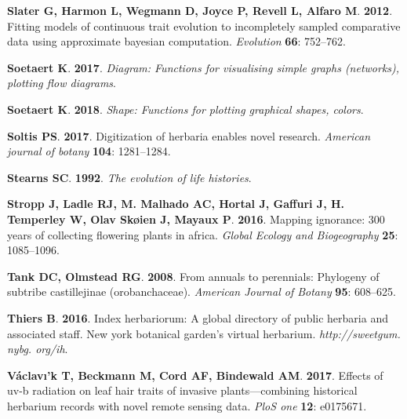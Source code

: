 \documentclass[man,floatsintext]{apa6}
\theoremstyle{definition}
\theoremstyle{definition}
\theoremstyle{definition}
\theoremstyle{remark}
\begin{document}
\leavevmode\hypertarget{ref-R-geiger_c}{}%
\textbf{\textnormal{Slater G}, \textnormal{Harmon L},
\textnormal{Wegmann D}, \textnormal{Joyce P}, \textnormal{Revell L},
\textnormal{Alfaro M}}. \textbf{2012}. Fitting models of continuous
trait evolution to incompletely sampled comparative data using
approximate bayesian computation. \emph{Evolution} \textbf{66}:
752--762.

\leavevmode\hypertarget{ref-R-diagram}{}%
\textbf{\textnormal{Soetaert K}}. \textbf{2017}. \emph{Diagram:
Functions for visualising simple graphs (networks), plotting flow
diagrams}.

\leavevmode\hypertarget{ref-R-shape}{}%
\textbf{\textnormal{Soetaert K}}. \textbf{2018}. \emph{Shape: Functions
for plotting graphical shapes, colors}.

\leavevmode\hypertarget{ref-soltis2017digitization}{}%
\textbf{\textnormal{Soltis PS}}. \textbf{2017}. Digitization of herbaria
enables novel research. \emph{American journal of botany} \textbf{104}:
1281--1284.

\leavevmode\hypertarget{ref-stearns1992evolution}{}%
\textbf{\textnormal{Stearns SC}}. \textbf{1992}. \emph{The evolution of
life histories}.

\leavevmode\hypertarget{ref-stropp2016mapping}{}%
\textbf{\textnormal{Stropp J}, \textnormal{Ladle RJ}, \textnormal{M.
Malhado AC}, \textnormal{Hortal J}, \textnormal{Gaffuri J},
\textnormal{H. Temperley W}, \textnormal{Olav Skøien J},
\textnormal{Mayaux P}}. \textbf{2016}. Mapping ignorance: 300 years of
collecting flowering plants in africa. \emph{Global Ecology and
Biogeography} \textbf{25}: 1085--1096.

\leavevmode\hypertarget{ref-tank2008annuals}{}%
\textbf{\textnormal{Tank DC}, \textnormal{Olmstead RG}}. \textbf{2008}.
From annuals to perennials: Phylogeny of subtribe castillejinae
(orobanchaceae). \emph{American Journal of Botany} \textbf{95}:
608--625.

\leavevmode\hypertarget{ref-thiers2016index}{}%
\textbf{\textnormal{Thiers B}}. \textbf{2016}. Index herbariorum: A
global directory of public herbaria and associated staff. New york
botanical garden's virtual herbarium. \emph{http://sweetgum. nybg.
org/ih}.

\leavevmode\hypertarget{ref-vaclavik2017effects}{}%
\textbf{\textnormal{Václavı'k T}, \textnormal{Beckmann M},
\textnormal{Cord AF}, \textnormal{Bindewald AM}}. \textbf{2017}. Effects
of uv-b radiation on leaf hair traits of invasive plants---combining
historical herbarium records with novel remote sensing data. \emph{PloS
one} \textbf{12}: e0175671.
\end{document}
